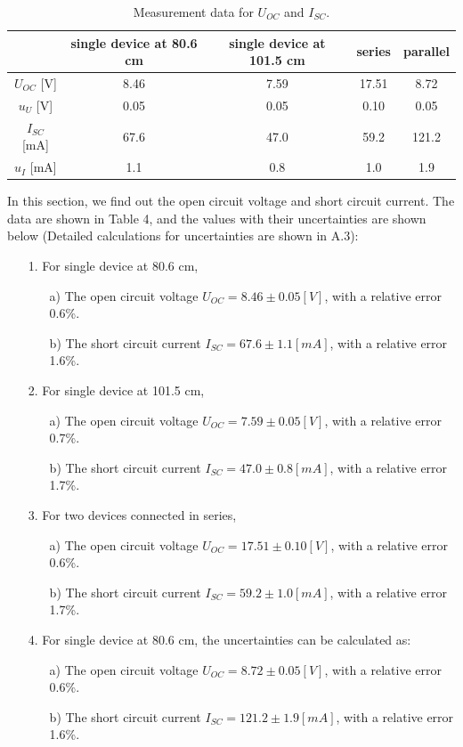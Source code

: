 \documentclass[a4paper,12pt]{article}
\begin{document}
\begin{table}[H]
\begin{center}
\begin{tabular}{|c|c|c|c|c|}
\hline
 & single device at 80.6 cm & single device at 101.5 cm & series & parallel \\ \hline
$U_{OC}$ {[}V{]} & 8.46 & 7.59 & 17.51 & 8.72 \\ \hline
$u_U$ {[}V{]} & 0.05 & 0.05 & 0.10 & 0.05 \\ \hline
$I_{SC}$ {[}mA{]} & 67.6 & 47.0 & 59.2 & 121.2 \\ \hline
$u_I$ {[}mA{]} & 1.1 & 0.8 & 1.0 & 1.9 \\ \hline
\end{tabular}
\caption{Measurement data for $U_{OC}$ and $I_{SC}$.}
\end{center}
\end{table}
In this section, we find out the open circuit voltage and short circuit current. The data are shown in Table 4, and the values with their uncertainties are shown below (Detailed calculations for uncertainties are shown in A.3):
\begin{itemize}
\item[1.] For single device at 80.6 cm,
			\begin{itemize}
			\item[a)] The open circuit voltage $U_{OC} = 8.46 \pm 0.05 [V]$, with a relative error 0.6\%.
			\item[b)] The short circuit current $I_{SC} = 67.6 \pm 1.1 [mA]$, with a relative error 1.6\%.
			\end{itemize}
\item[2.] For single device at 101.5 cm,
			\begin{itemize}
			\item[a)] The open circuit voltage $U_{OC} = 7.59 \pm 0.05 [V]$, with a relative error 0.7\%.
			\item[b)] The short circuit current $I_{SC} = 47.0 \pm 0.8 [mA]$, with a relative error 1.7\%.
			\end{itemize}
\item[3.] For two devices connected in series,
			\begin{itemize}
			\item[a)] The open circuit voltage $U_{OC} = 17.51 \pm 0.10 [V]$, with a relative error 0.6\%.
			\item[b)] The short circuit current $I_{SC} = 59.2 \pm 1.0 [mA]$, with a relative error 1.7\%.
			\end{itemize}
\item[4.] For single device at 80.6 cm, the uncertainties can be calculated as:
			\begin{itemize}
			\item[a)] The open circuit voltage $U_{OC} = 8.72 \pm 0.05 [V]$, with a relative error 0.6\%.
			\item[b)] The short circuit current $I_{SC} = 121.2 \pm 1.9 [mA]$, with a relative error 1.6\%.
			\end{itemize}
\end{itemize}
\end{document}
